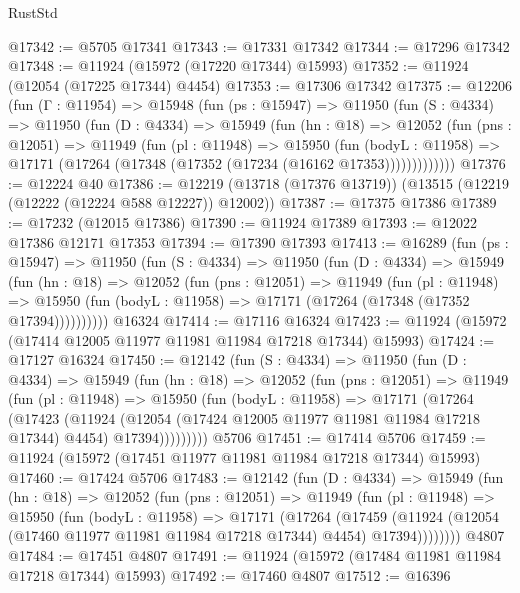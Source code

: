 \begin{lexlean}{RustStd}
\begin{coremodule}
{\begin{coremodule}
{{{{{{{{{{{{{{{{{{{{{{{{{{{{{{{{{{{{{{{{{{{{{{{{{{{{{{{{{{{{{{{{{{{{{{{{{{{{{{{{@17342 := @5705 @17341
@17343 := @17331 @17342
@17344 := @17296 @17342
@17348 := @11924 (@15972 (@17220 @17344) @15993)
@17352 := @11924 (@12054 (@17225 @17344) @4454)
@17353 := @17306 @17342
@17375 := @12206
    (fun (Γ : @11954) =>
    @15948
      (fun (ps : @15947) =>
      @11950
        (fun (S : @4334) =>
        @11950
          (fun (D : @4334) =>
          @15949
            (fun (hn : @18) =>
            @12052
              (fun (pns : @12051) =>
              @11949
                (fun (pl : @11948) =>
                @15950
                  (fun (bodyL : @11958) =>
                  @17171 (@17264 (@17348 (@17352 (@17234 (@16162 @17353)))))))))))))
@17376 := @12224 @40
@17386 := @12219 (@13718 (@17376 @13719)) (@13515 (@12219 (@12222 (@12224 @588 @12227)) @12002))
@17387 := @17375 @17386
@17389 := @17232 (@12015 @17386)
@17390 := @11924 @17389
@17393 := @12022 @17386 @12171 @17353
@17394 := @17390 @17393
@17413 := @16289
    (fun (ps : @15947) =>
    @11950
      (fun (S : @4334) =>
      @11950
        (fun (D : @4334) =>
        @15949
          (fun (hn : @18) =>
          @12052
            (fun (pns : @12051) =>
            @11949
              (fun (pl : @11948) =>
              @15950 (fun (bodyL : @11958) => @17171 (@17264 (@17348 (@17352 @17394))))))))))
    @16324
@17414 := @17116 @16324
@17423 := @11924 (@15972 (@17414 @12005 @11977 @11981 @11984 @17218 @17344) @15993)
@17424 := @17127 @16324
@17450 := @12142
    (fun (S : @4334) =>
    @11950
      (fun (D : @4334) =>
      @15949
        (fun (hn : @18) =>
        @12052
          (fun (pns : @12051) =>
          @11949
            (fun (pl : @11948) =>
            @15950
              (fun (bodyL : @11958) =>
              @17171
                (@17264
                  (@17423
                    (@11924
                      (@12054 (@17424 @12005 @11977 @11981 @11984 @17218 @17344) @4454)
                      @17394)))))))))
    @5706
@17451 := @17414 @5706
@17459 := @11924 (@15972 (@17451 @11977 @11981 @11984 @17218 @17344) @15993)
@17460 := @17424 @5706
@17483 := @12142
    (fun (D : @4334) =>
    @15949
      (fun (hn : @18) =>
      @12052
        (fun (pns : @12051) =>
        @11949
          (fun (pl : @11948) =>
          @15950
            (fun (bodyL : @11958) =>
            @17171
              (@17264
                (@17459
                  (@11924 (@12054 (@17460 @11977 @11981 @11984 @17218 @17344) @4454) @17394))))))))
    @4807
@17484 := @17451 @4807
@17491 := @11924 (@15972 (@17484 @11981 @11984 @17218 @17344) @15993)
@17492 := @17460 @4807
@17512 := @16396
}}}}}}}}}}}}}}}}}}}}}}}}}}}}}}}}}}}}}}}}}}}}}}}}}}}}}}}}}}}}}}}}}}}}}}}}}}}}}}}}
\end{coremodule}}
\end{coremodule}
\end{lexlean}
